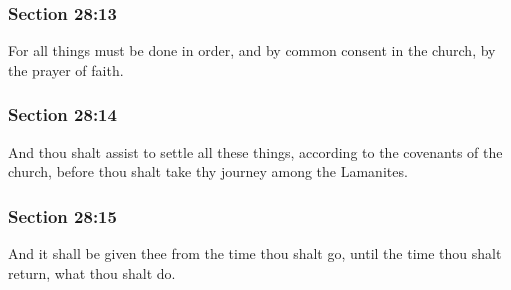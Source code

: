 	\subsubsection{Section 28:13} %
		\label{DC28-13}

		For all things must be done in order, and by common consent in the church, by the prayer of faith.


	\subsubsection{Section 28:14} %
		\label{DC28-14}

		And thou shalt assist to settle all these things, according to the covenants of the church, before thou shalt take thy journey among the Lamanites.


	\subsubsection{Section 28:15} %
		\label{DC28-15}

		And it shall be given thee from the time thou shalt go, until the time thou shalt return, what thou shalt do.


